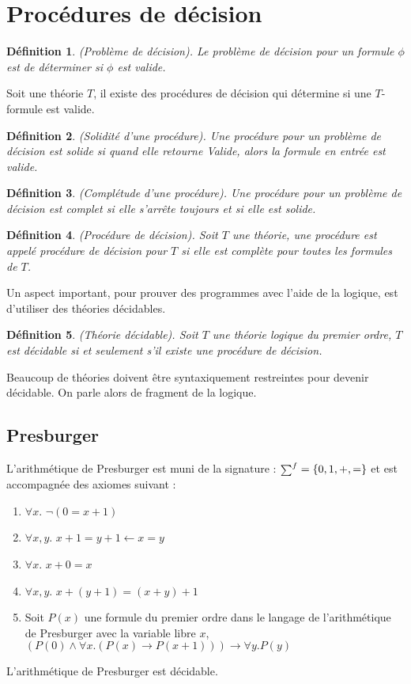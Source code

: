 \documentclass[9pt]{book}
\newcommand\smallsum{\mathsmaller\sum}
\newtheorem{definition}{D\'efinition}[section]
\begin{document}
 	\section{Proc\'edures de d\'ecision}
 	\begin{definition}
 	(Probl\`eme de d\'ecision). Le probl\`eme de d\'ecision pour un formule $\phi$ est de d\'eterminer si $\phi$ est valide.
 	\end{definition}
 	Soit une th\'eorie $T$, il existe des proc\'edures de d\'ecision qui d\'etermine si une $T$-formule est valide.
 	\begin{definition}
 	(Solidit\'e d'une proc\'edure). Une proc\'edure pour un probl\`eme de d\'ecision est solide si quand elle retourne \textit{Valide}, alors la formule en entr\'ee est valide.
 	\end{definition}
 	\begin{definition}
 		(Compl\'etude d'une proc\'edure). Une proc\'edure pour un probl\`eme de d\'ecision est complet si elle s'arr\^ete toujours et si elle est solide.
 	\end{definition}
 	\begin{definition}
 	(Proc\'edure de d\'ecision). Soit $T$ une th\'eorie, une proc\'edure est appel\'e \textit{proc\'edure de d\'ecision pour $T$} si elle est compl\`ete pour toutes les formules de $T$. 
 	\end{definition} 	
 	Un aspect important, pour prouver des programmes avec l'aide de la logique, est d'utiliser des th\'eories d\'ecidables.
	\begin{definition}
	(Th\'eorie d\'ecidable). Soit $T$ une th\'eorie logique du premier ordre, $T$ est d\'ecidable si et seulement s'il existe une proc\'edure de d\'ecision.
	\end{definition}
Beaucoup de th\'eories doivent \^etre syntaxiquement restreintes pour devenir d\'ecidable. On parle alors de fragment de la logique.		\		\subsection{Presburger}
		L'arithm\'etique de Presburger est muni de la signature : $\smallsum^{f}=\{0,1,+,=\}$ et est accompagn\'ee des axiomes suivant :
		\begin{enumerate}
		\item $\forall x.$ $\neg(0=x+1)$
		\item $\forall x,y.$ $x + 1=y+1\leftarrow x=y$
		\item $\forall x.$ $x+0=x$
		\item $\forall x,y.$ $x+(y+1)=(x+y)+1$
		\item Soit $P(x)$ une formule du premier ordre dans le langage de l'arithm\'etique de Presburger avec la variable libre $x$,\\
		$(P(0)\land\forall x.(P(x)\rightarrow P(x+1)))\rightarrow\forall y. P(y)$
		\end{enumerate}
		L'arithm\'etique de Presburger est d\'ecidable.
		
\end{document}
